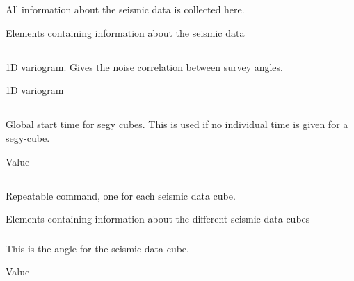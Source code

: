  \section{\necessary} 
 \slist
   \item \Description All information about the seismic data is collected here.
   \item \Argument Elements containing information about the seismic data
   \item \Default
 \elist

 \subsection{}
 \slist
   \item \Description 1D variogram. Gives the noise correlation between survey angles.
   \item \Argument 1D variogram
   \item \Default
 \elist

 \subsection{}
 \slist
   \item \Description Global start time for segy cubes. This is used if no individual time is given for a segy-cube.
   \item \Argument Value
   \item \Default
 \elist

\subsection{\necessary}
 \slist
   \item \Description Repeatable command, one for each seismic data cube.
   \item \Argument Elements containing information about the different seismic data cubes
   \item \Default
 \elist

\subsubsection{\necessary}
 \slist
   \item \Description This is the angle for the seismic data cube.
   \item \Argument Value
   \item \Default
 \elist

